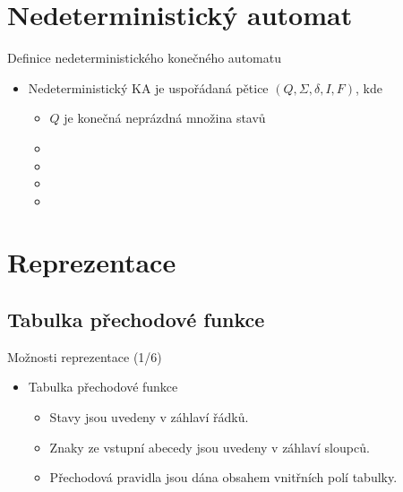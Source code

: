 \documentclass[hyperref={unicode}]{beamer}
\begin{document}
\section{Nedeterministický automat}
\begin{frame}[t]{Definice nedeterministického konečného automatu}
\begin{itemize}
    \item Nedeterministický KA je uspořádaná pětice  $(Q,\Sigma,\delta,I,F)$, kde \hspace{3cm}
    \begin{itemize}
        \setlength\itemsep{0.7em}
        \item $Q$ je konečná neprázdná množina stavů
        \item {}
        \item {}
        \item {}
        \item {}
    \end{itemize}
\end{itemize}
\end{frame}

\section{Reprezentace}
\subsection{Tabulka přechodové funkce}
\begin{frame}[t]{Možnosti reprezentace (1/6)}
\begin{itemize}
    \item Tabulka přechodové funkce \vspace{1em}
    \begin{itemize}
        \setlength\itemsep{0.7em}
        \item Stavy jsou uvedeny v záhlaví řádků.
        \item Znaky ze vstupní abecedy jsou uvedeny v záhlaví sloupců.
        \item Přechodová pravidla jsou dána obsahem vnitřních polí tabulky.
    \end{itemize}
\end{itemize}
\end{frame}
\end{document}

